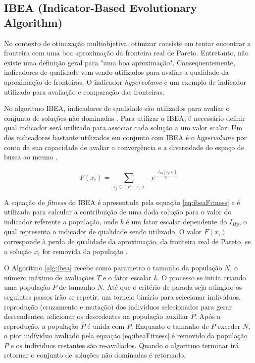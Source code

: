 
\subsection{IBEA (Indicator-Based Evolutionary Algorithm)}

No contexto de otimização multiobjetiva, otimizar consiste em tentar encontrar a fronteira com uma boa aproximação da fronteira real de Pareto. 
Entretanto, não existe uma definição geral para "uma boa aproximação". Consequentemente, indicadores de qualidade vem sendo utilizados
para avaliar a qualidade da aproximação de fronteiras. O indicador \textit{hypervolume} é um exemplo de indicador utilizado para avaliação e comparação 
das fronteiras.

No algoritmo IBEA, indicadores de qualidade são	utilizados para avaliar o conjunto de soluções não dominadas \cite{figueiredo2013algoritmo}.
Para utilizar o IBEA, é necessário definir qual indicador será utilizado para associar cada solução a um valor scalar. Um dos indicadores bastante utilizados
em conjunto com IBEA é o \textit{hypervolume} por conta da sua capacidade de avaliar a convergência e a diversidade do espaço de busca ao mesmo \cite{ishibuchi2008evolutionary}.

\begin{equation} \label{eq:ibeaFitness}
F(x_i) = \sum_{x_j \in (P-x_i)} {-e^\frac{-I_{Hy}(x_j,x_i)}{k}}
\end{equation}

A equação de \textit{fitness} do IBEA é apresentada pela equação \ref{eq:ibeaFitness} e é utilizada para calcular a contribuição de uma dada solução
para o valor do indicador referente a população, onde $k$ é um fator escalar dependente do $I_{Hy}$, o qual representa o indicador de qualidade sendo utilizado.
O valor $F(x_i)$ corresponde à perda de qualidade da aproximação, da fronteira real de Pareto, se a solução $x_i$ for removida da população \cite{figueiredo2013algoritmo}.


O Algoritmo \ref{alg:ibea} recebe como parametro o tamanho da população $N$, o número máximo de avaliações $T$ e o fator escalar $k$. O processo se inicia
criando uma população $P$ de tamanho $N$. Até que o critério de parada seja atingido os seguintes passos irão se repetir: um torneio binário 
para selecionar indivíduos, reprodução (cruzamento e mutação) dos indivíduos selecionados para gerar descendentes, adicionar os descedentes na população
auxiliar $\overline P$. Após a reprodução, a população $\overline P$ é unida com $P$. Enquanto o tamanho de $P$ exceder $N$, o pior indíviduo avaliado
pela equação \ref{eq:ibeaFitness} é removido da população $P$ e os indíviduos restantes são re-avaliados. Quando o algoritmo terminar irá retornar o conjunto
de soluções não dominadas é retornado.

